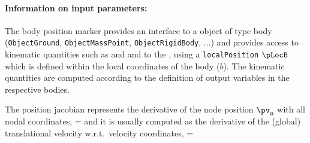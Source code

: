 \paragraph{Information on input parameters:} 
\finishTable
 \noindent
    The body position marker provides an interface to a object of type body 
    (\texttt{ObjectGround}, \texttt{ObjectMassPoint}, \texttt{ObjectRigidBody}, ...)
    and provides access to kinematic quantities such as  and  
    and to the , using a \texttt{localPosition} $\pLocB$ which is defined within the 
    local coordinates of the body ($b$).
    The kinematic quantities are computed according to the definition of output variables in the respective bodies.
    
    The position jacobian represents the derivative of the node position $\pv_\mathrm{n}$ with all nodal coordinates,
    \be
       = 
    \ee
    and it is usually computed as the derivative of the (global) translational velocity w.r.t.\ velocity coordinates,
    \be
       = 
    \ee

